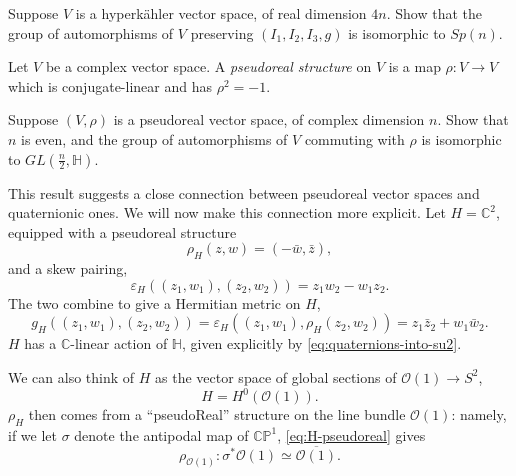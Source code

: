 \documentclass[12pt,letterpaper,reqno]{article}
\numberwithin{equation}{section}
\newcommand{\cO}{\ensuremath{\mathcal O}}
\newcommand{\C}{\ensuremath{\mathbb C}}
\newcommand{\PP}{\ensuremath{\mathbb P}}
\newcommand{\bbH}{\ensuremath{\mathbb H}}
\newcommand{\hk}{hyperk\"ahler\xspace}
\newcommand{\ti}[1]{\textit{#1}}
\newcommand{\fixme}[1]{{\color{orange}{[#1]}}}
\begin{document}
\begin{exercise} Suppose $V$ is a \hk vector space, of real dimension $4n$.
Show that the group of automorphisms of $V$ preserving $(I_1,I_2,I_3,g)$
is isomorphic to $Sp(n)$. \fixme{need to use existence of basis}
\end{exercise}

\begin{defn} Let $V$ be a complex
vector space. A \ti{pseudoreal structure}
on $V$ is a map $\rho: V \to V$ which is conjugate-linear
and has $\rho^2 = -1$.
\end{defn}

\begin{exercise} Suppose $(V,\rho)$ is a pseudoreal vector space, of complex
dimension $n$. Show that $n$ is even, and the group of automorphisms
of $V$ commuting with $\rho$ is isomorphic to $GL(\frac{n}{2}, \bbH)$.
\fixme{need to use standard form for pseudoreal structure?}
\end{exercise}

This result suggests a close connection between pseudoreal vector spaces
and quaternionic ones. We will now make this connection more explicit.
Let $H = \C^2$,
equipped with a pseudoreal structure
\begin{equation} \label{eq:H-pseudoreal}
  \rho_H(z,w) = (-\bar{w},\bar{z}),
\end{equation}
and a skew pairing,
\begin{equation}
  \varepsilon_H((z_1,w_1),(z_2,w_2)) = z_1 w_2 - w_1 z_2.
\end{equation}
The two combine to give a Hermitian metric on $H$,
\begin{equation}
  g_H((z_1,w_1),(z_2,w_2)) = \varepsilon_H((z_1,w_1),\rho_H(z_2,w_2)) = z_1 \bar{z}_2 + w_1 \bar{w}_2.
\end{equation}
$H$ has a $\C$-linear action of $\bbH$,
given explicitly by \eqref{eq:quaternions-into-su2}.

We can also think of $H$ as the vector space of global
sections of $\cO(1) \to S^2$,
\begin{equation}
  H = H^0(\cO(1)).
\end{equation}
$\rho_H$ then comes from a ``pseudoReal'' structure
on the line bundle $\cO(1)$: namely, if we let $\sigma$ denote
the antipodal map of $\C\PP^1$, \eqref{eq:H-pseudoreal} gives
\begin{equation}
  \rho_{\cO(1)}: \sigma^* \cO(1) \simeq \overline{\cO(1)}.
\end{equation}
\end{document}
